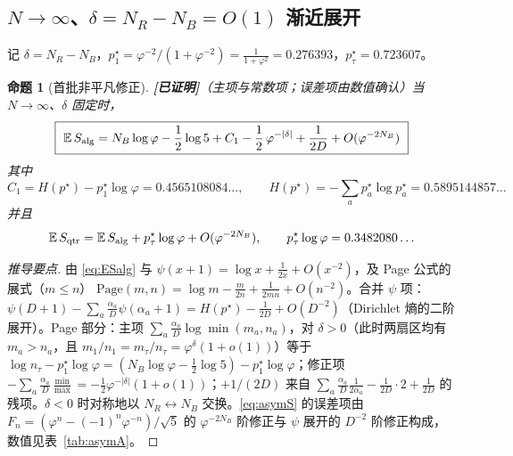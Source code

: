 \documentclass[11pt,a4paper]{ctexart}
\newtheorem{proposition}{命题}
\theoremstyle{definition}
\newcommand{\proved}{\textcolor{green!45!black}{\textbf{[已证明]}}}
\newcommand{\E}{\mathbb{E}}
\newcommand{\ph}{\varphi}
\newcommand{\Nalg}{S_{\rm alg}}
\newcommand{\Nqtr}{S_{\rm qtr}}
\newcommand{\Page}{\mathrm{Page}}
\begin{document}
\subsection{$N\to\infty$、$\delta=N_R-N_B=O(1)$ 渐近展开}

记 $\delta=N_R-N_B$，$p_1^\star=\ph^{-2}/(1+\ph^{-2})=\frac{1}{1+\ph^2}=0.276393$，$p_\tau^\star=0.723607$。

\begin{proposition}[首批非平凡修正]\proved{（主项与常数项；误差项由数值确认）}\label{prop:asymA}
当 $N\to\infty$、$\delta$ 固定时，
\begin{equation}\label{eq:asymS}
\boxed{\ \E\,\Nalg=N_B\log\ph-\frac12\log 5+C_1-\frac12\,\ph^{-|\delta|}+\frac{1}{2D}+O(\ph^{-2N_B})\ }
\end{equation}
其中
\[
C_1=H(p^\star)-p_1^\star\log\ph=0.4565108084\ldots,\qquad
H(p^\star)=-\sum_ap_a^\star\log p_a^\star=0.5895144857\ldots
\]
并且
\[
\E\,\Nqtr=\E\,\Nalg+p_\tau^\star\log\ph+O(\ph^{-2N_B}),\qquad p_\tau^\star\log\ph=0.3482080\ldots
\]
\end{proposition}
\begin{proof}[推导要点]
由 \eqref{eq:ESalg} 与 $\psi(x+1)=\log x+\frac{1}{2x}+O(x^{-2})$，及 Page 公式的展式（$m\le n$）
$\Page(m,n)=\log m-\frac{m}{2n}+\frac{1}{2mn}+O(n^{-2})$。合并 $\psi$ 项：$\psi(D+1)-\sum_a\frac{\alpha_a}{D}\psi(\alpha_a+1)=H(p^\star)-\frac{1}{2D}+O(D^{-2})$（Dirichlet 熵的二阶展开）。Page 部分：主项 $\sum_a\frac{\alpha_a}{D}\log\min(m_a,n_a)$，对 $\delta>0$（此时两扇区均有 $m_a>n_a$，且 $m_1/n_1=m_\tau/n_\tau=\ph^{\delta}(1+o(1))$）等于 $\log n_\tau-p_1^\star\log\ph=(N_B\log\ph-\frac12\log5)-p_1^\star\log\ph$；修正项 $-\sum_a\frac{\alpha_a}{D}\frac{\min}{\max}=-\frac12\ph^{-|\delta|}(1+o(1))$；$+1/(2D)$ 来自 $\sum_a\frac{\alpha_a}{D}\frac{1}{2\alpha_a}-\frac{1}{2D}\cdot 2+\frac{1}{2D}$ 的残项。$\delta<0$ 时对称地以 $N_R\leftrightarrow N_B$ 交换。\eqref{eq:asymS} 的误差项由 $F_{n}=(\ph^n-(-1)^n\ph^{-n})/\sqrt5$ 的 $\ph^{-2N_B}$ 阶修正与 $\psi$ 展开的 $D^{-2}$ 阶修正构成，数值见表~\ref{tab:asymA}。
\end{proof}
\end{document}
